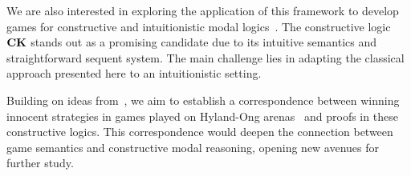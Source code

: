 We are also  interested in exploring the application of this framework to develop games for constructive and intuitionistic modal logics~\cite{Fitch,plotkin:stirling:86,Sim94,DBLP:journals/sLogica/BiermanP00}. The constructive logic $\textbf{CK}$ stands out as a promising candidate due to its intuitive semantics and straightforward sequent system. The main challenge lies in adapting the classical approach presented here to an intuitionistic setting. %

Building on ideas from~\cite{DBLP:conf/eumas/AcclavioC23}, we aim to establish a correspondence between winning innocent strategies in games played on Hyland-Ong arenas~\cite{DBLP:journals/iandc/HylandO00} and proofs in these constructive logics. This correspondence would deepen the connection between game semantics and constructive modal reasoning, opening new avenues for further study.

 
